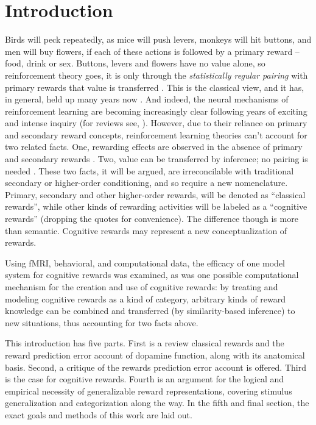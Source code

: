 \section{Introduction} %
\label{sec:introduction}
Birds will peck repeatedly, as mice will push levers, monkeys will hit buttons, and men will buy flowers, if each of these actions is followed by a primary reward -- food, drink or sex.  Buttons, levers and flowers have no value alone, so reinforcement theory goes, it is only through the \emph{statistically regular pairing} with primary rewards that value is transferred \cite{Rescorla:1988p8743}.  This is the classical view, and it has, in general, held up many years now \cite{iversen:2007aa}.  And indeed, the neural mechanisms of reinforcement learning are becoming increasingly clear following years of exciting and intense inquiry (for reviews see, ).  However, due to their reliance on primary and secondary reward concepts, reinforcement learning theories can't account for two related facts.  One, rewarding effects are observed in the absence of primary and secondary rewards \cite{Hayden:2009p6545, Lohrenz:2007p7240, Tricomi:2008p6663, Jimura:2010p8305}. Two, value can be transferred by inference; no pairing is needed \cite{BrombergMartin:2010p7223, Hampton:2006p2577}.  These two facts, it will be argued, are irreconcilable with traditional secondary or higher-order conditioning, and so require a new nomenclature.  Primary, secondary and other higher-order rewards, will be denoted as ``classical rewards'', while other kinds of rewarding activities will be labeled as a ``cognitive rewards'' (dropping the quotes for convenience).  The difference though is more than semantic.  Cognitive rewards may represent a new conceptualization of rewards.

Using fMRI, behavioral, and computational data, the efficacy of one model system for cognitive rewards was examined, as was one possible computational mechanism for the creation and use of cognitive rewards: by treating and modeling cognitive rewards as a kind of category, arbitrary kinds of reward knowledge can be combined and transferred (by similarity-based inference) to new situations, thus accounting for two facts above.

This introduction has five parts.  First is a review classical rewards and the reward prediction error account of dopamine function, along with its anatomical basis.  Second, a critique of the rewards prediction error account is offered.  Third is the case for cognitive rewards.  Fourth is an argument for the logical and empirical necessity of generalizable reward representations, covering stimulus generalization and categorization along the way.  In the fifth and final section, the exact goals and methods of this work are laid out.  

